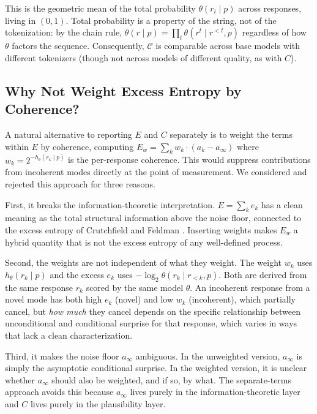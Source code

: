 \documentclass[11pt]{article}
\begin{document}
This is the geometric mean of the total probability $\theta(r_i \mid p)$ across responses, living in $(0,1)$. Total probability is a property of the string, not of the tokenization: by the chain rule, $\theta(r \mid p) = \prod_t \theta(r^t \mid r^{<t}, p)$ regardless of how $\theta$ factors the sequence. Consequently, $\mathcal{C}$ is comparable across base models with different tokenizers (though not across models of different quality, as with $C$).

\subsection{Why Not Weight Excess Entropy by Coherence?}\label{sec:why-not-weight}

A natural alternative to reporting $E$ and $C$ separately is to weight the terms within $E$ by coherence, computing $E_w = \sum_k w_k \cdot (a_k - a_\infty)$ where $w_k = 2^{-h_\theta(r_k \mid p)}$ is the per-response coherence. This would suppress contributions from incoherent modes directly at the point of measurement. We considered and rejected this approach for three reasons.

First, it breaks the information-theoretic interpretation. $E = \sum_k e_k$ has a clean meaning as the total structural information above the noise floor, connected to the excess entropy of Crutchfield and Feldman \citeyearpar{crutchfield2003regularities}. Inserting weights makes $E_w$ a hybrid quantity that is not the excess entropy of any well-defined process.

Second, the weights are not independent of what they weight. The weight $w_k$ uses $h_\theta(r_k \mid p)$ and the excess $e_k$ uses $-\log_2 \theta(r_k \mid r_{<k}, p)$. Both are derived from the same response $r_k$ scored by the same model $\theta$. An incoherent response from a novel mode has both high $e_k$ (novel) and low $w_k$ (incoherent), which partially cancel, but \emph{how much} they cancel depends on the specific relationship between unconditional and conditional surprise for that response, which varies in ways that lack a clean characterization.

Third, it makes the noise floor $a_\infty$ ambiguous. In the unweighted version, $a_\infty$ is simply the asymptotic conditional surprise. In the weighted version, it is unclear whether $a_\infty$ should also be weighted, and if so, by what. The separate-terms approach avoids this because $a_\infty$ lives purely in the information-theoretic layer and $C$ lives purely in the plausibility layer.
\end{document}
